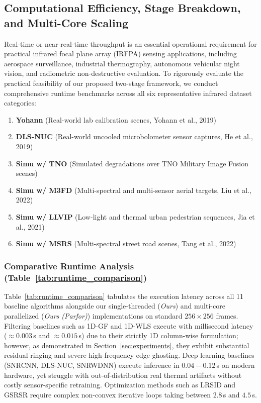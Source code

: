 
\subsection{Computational Efficiency, Stage Breakdown, and Multi-Core Scaling}
\label{sec:runtime_analysis}

Real-time or near-real-time throughput is an essential operational requirement for practical infrared focal plane array (IRFPA) sensing applications, including aerospace surveillance, industrial thermography, autonomous vehicular night vision, and radiometric non-destructive evaluation. To rigorously evaluate the practical feasibility of our proposed two-stage framework, we conduct comprehensive runtime benchmarks across all six representative infrared dataset categories:
\begin{enumerate}
    \item \textbf{Yohann} (Real-world lab calibration scenes, Yohann et al., 2019)
    \item \textbf{DLS-NUC} (Real-world uncooled microbolometer sensor captures, He et al., 2019)
    \item \textbf{Simu w/ TNO} (Simulated degradations over TNO Military Image Fusion scenes)
    \item \textbf{Simu w/ M3FD} (Multi-spectral and multi-sensor aerial targets, Liu et al., 2022)
    \item \textbf{Simu w/ LLVIP} (Low-light and thermal urban pedestrian sequences, Jia et al., 2021)
    \item \textbf{Simu w/ MSRS} (Multi-spectral street road scenes, Tang et al., 2022)
\end{enumerate}



\subsubsection{Comparative Runtime Analysis (Table~\ref{tab:runtime_comparison})}
Table~\ref{tab:runtime_comparison} tabulates the execution latency across all 11 baseline algorithms alongside our single-threaded (\textit{Ours}) and multi-core parallelized (\textit{Ours (Parfor)}) implementations on standard $256 \times 256$ frames. 
Filtering baselines such as 1D-GF and 1D-WLS execute with millisecond latency ($\approx 0.003$\,s and $\approx 0.015$\,s) due to their strictly 1D column-wise formulation; however, as demonstrated in Section~\ref{sec:experiments}, they exhibit substantial residual ringing and severe high-frequency edge ghosting. Deep learning baselines (SNRCNN, DLS-NUC, SNRWDNN) execute inference in $0.04-0.12$\,s on modern hardware, yet struggle with out-of-distribution real thermal artifacts without costly sensor-specific retraining. Optimization methods such as LRSID and GSRSR require complex non-convex iterative loops taking between $2.8$\,s and $4.5$\,s.

